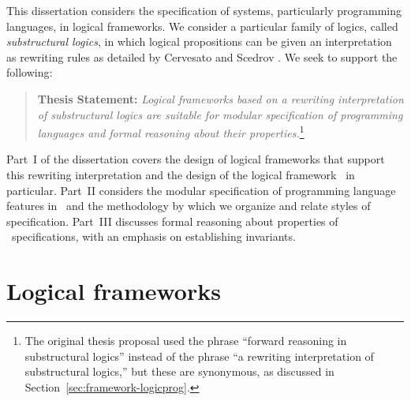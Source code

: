 This dissertation considers the specification of systems, particularly
programming languages, in logical frameworks. We
consider a particular family of logics, called {\it substructural
  logics}, in which logical propositions can be given an
interpretation as rewriting rules as detailed by Cervesato and Scedrov
\cite{cervesato09relating}. %
We seek to support the
following:
\smallskip
\begin{quote} {\bf Thesis Statement:} {\it Logical frameworks based on
    a rewriting interpretation of substructural logics are suitable
    for modular specification of programming languages and formal
    reasoning about their properties.}\footnote{The original thesis
    proposal used the phrase ``forward reasoning in substructural
    logics'' instead of the phrase ``a rewriting interpretation of
    substructural logics,'' but these are synonymous, as discussed in
    Section~\ref{sec:framework-logicprog}.}
\end{quote}
\smallskip

\noindent
Part~I of the dissertation covers the design of logical frameworks 
that support this rewriting interpretation and the design of the logical
framework \sls~in particular. Part~II considers the modular
specification of programming language features in \sls~and the
methodology by which we organize and relate styles of
specification. Part~III discusses formal reasoning about properties of
\sls~specifications, with an emphasis on establishing invariants.

\section{Logical frameworks}

